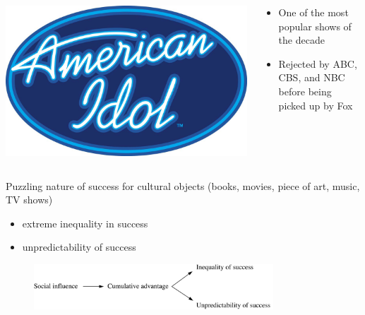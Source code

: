 \documentclass[aspectratio=169]{beamer}
\begin{document}
\begin{frame}

  \begin{columns}
     \begin{block}{}
       \includegraphics[width=\textwidth]{figures/american-idol}
     \end{block}

     \begin{block}{}
       \begin{itemize}
         \item One of the most popular shows of the decade
         \item Rejected by ABC, CBS, and NBC before being picked up by Fox
       \end{itemize}
     \end{block}
  \end{columns}

\end{frame}
\begin{frame}

Puzzling nature of success for cultural objects (books, movies, piece of art, music, TV shows)
\begin{itemize}
  \item<1-> {extreme inequality in success}
  \item <2->{unpredictability of success}
\end{itemize}

\end{frame}
\begin{frame} 

\begin{figure}
  \includegraphics[width = 0.8\textwidth]{figures/musiclab_model}
\end{figure}

\end{frame}
\end{document}
